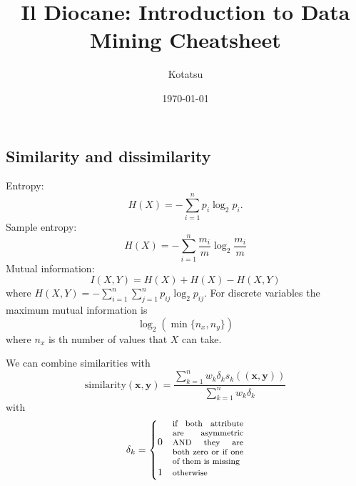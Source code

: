 \documentclass[a4paper,9pt]{extarticle}
\title{Il Diocane: Introduction to Data Mining Cheatsheet}
\author{\faSynagogue\;Kotatsu}
\date{\today}
\begin{document}
	
\maketitle
	
\begin{multicols*}{2}
\section{Similarity and dissimilarity}
\begin{riquadro}
	Entropy:
	\begin{equation*}
		H(X)=-\sum_{i=1}^{n}p_{i}\log_{2}p_i.
	\end{equation*}
	Sample entropy:
	\begin{equation*}
		H(X)=-\sum_{i=1}^{n}\frac{m_{i}}{m}\log_{2}\frac{m_{i}}{m}
	\end{equation*}
	Mutual information:
	\begin{equation*}
		I(X,Y)=H(X)+H(X)-H(X,Y)
	\end{equation*}
	where $H(X,Y)=-\sum_{i=1}^{n}\sum_{j=1}^{n}p_{ij}\log_{2}p_{ij}$. For discrete variables the maximum mutual information is 
	\begin{equation*}
		\log_{2}(\min\{n_{x},n_{y}\})
	\end{equation*}
	where $n_{x}$ is th number of values that $X$ can take.
\end{riquadro}
We can combine similarities with
\begin{equation*}
	\mathrm{similarity}(\mathbf{x},\mathbf{y})=\frac{\sum_{k=1}^{n}w_k\delta_{k}s_{k}((\mathbf{x},\mathbf{y}))}{\sum_{k=1}^{n}w_k\delta_{k}}
\end{equation*}
with
\begin{equation*}
	\delta_{k}=\begin{cases}
		0&\text{\footnotesize\parbox{2.5cm}{if both attribute are asymmetric AND they are both zero or if one of them is missing}}\\
		1&\text{\footnotesize otherwise}
	\end{cases}
\end{equation*}

\end{multicols*}
\end{document}
